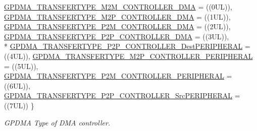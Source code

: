 \begin{DoxyCompactItemize}
\hyperlink{group__GPDMA__17XX__40XX_gga2cb59b641cd840f22780c44be1208133ae5ff87adb4451f2a695c9d21c3c52c59}{G\-P\-D\-M\-A\-\_\-\-T\-R\-A\-N\-S\-F\-E\-R\-T\-Y\-P\-E\-\_\-\-M2\-M\-\_\-\-C\-O\-N\-T\-R\-O\-L\-L\-E\-R\-\_\-\-D\-M\-A} = ((0\-U\-L)), 
\hyperlink{group__GPDMA__17XX__40XX_gga2cb59b641cd840f22780c44be1208133a331474560497f41cfe921b0e55ce8722}{G\-P\-D\-M\-A\-\_\-\-T\-R\-A\-N\-S\-F\-E\-R\-T\-Y\-P\-E\-\_\-\-M2\-P\-\_\-\-C\-O\-N\-T\-R\-O\-L\-L\-E\-R\-\_\-\-D\-M\-A} = ((1\-U\-L)), 
\hyperlink{group__GPDMA__17XX__40XX_gga2cb59b641cd840f22780c44be1208133aa2ae587fb924cb679f51250470927e34}{G\-P\-D\-M\-A\-\_\-\-T\-R\-A\-N\-S\-F\-E\-R\-T\-Y\-P\-E\-\_\-\-P2\-M\-\_\-\-C\-O\-N\-T\-R\-O\-L\-L\-E\-R\-\_\-\-D\-M\-A} = ((2\-U\-L)), 
\hyperlink{group__GPDMA__17XX__40XX_gga2cb59b641cd840f22780c44be1208133a29ec59e967f3a1841002ef740552c1d5}{G\-P\-D\-M\-A\-\_\-\-T\-R\-A\-N\-S\-F\-E\-R\-T\-Y\-P\-E\-\_\-\-P2\-P\-\_\-\-C\-O\-N\-T\-R\-O\-L\-L\-E\-R\-\_\-\-D\-M\-A} = ((3\-U\-L)), 
\\*
\hyperlink{group__GPDMA__17XX__40XX_gga2cb59b641cd840f22780c44be1208133a176e307292918213de220bdae957ad6d}{G\-P\-D\-M\-A\-\_\-\-T\-R\-A\-N\-S\-F\-E\-R\-T\-Y\-P\-E\-\_\-\-P2\-P\-\_\-\-C\-O\-N\-T\-R\-O\-L\-L\-E\-R\-\_\-\-Dest\-P\-E\-R\-I\-P\-H\-E\-R\-A\-L} = ((4\-U\-L)), 
\hyperlink{group__GPDMA__17XX__40XX_gga2cb59b641cd840f22780c44be1208133a640177df7a3c696a9ccab9a09dcdbc0c}{G\-P\-D\-M\-A\-\_\-\-T\-R\-A\-N\-S\-F\-E\-R\-T\-Y\-P\-E\-\_\-\-M2\-P\-\_\-\-C\-O\-N\-T\-R\-O\-L\-L\-E\-R\-\_\-\-P\-E\-R\-I\-P\-H\-E\-R\-A\-L} = ((5\-U\-L)), 
\hyperlink{group__GPDMA__17XX__40XX_gga2cb59b641cd840f22780c44be1208133aaeaf72b20cee326722ee7650405e2e43}{G\-P\-D\-M\-A\-\_\-\-T\-R\-A\-N\-S\-F\-E\-R\-T\-Y\-P\-E\-\_\-\-P2\-M\-\_\-\-C\-O\-N\-T\-R\-O\-L\-L\-E\-R\-\_\-\-P\-E\-R\-I\-P\-H\-E\-R\-A\-L} = ((6\-U\-L)), 
\hyperlink{group__GPDMA__17XX__40XX_gga2cb59b641cd840f22780c44be1208133a4615bdb6a415ddc02f8eab20a700a17d}{G\-P\-D\-M\-A\-\_\-\-T\-R\-A\-N\-S\-F\-E\-R\-T\-Y\-P\-E\-\_\-\-P2\-P\-\_\-\-C\-O\-N\-T\-R\-O\-L\-L\-E\-R\-\_\-\-Src\-P\-E\-R\-I\-P\-H\-E\-R\-A\-L} = ((7\-U\-L))
 \}
\begin{DoxyCompactList}\small\item\em G\-P\-D\-M\-A Type of D\-M\-A controller. \end{DoxyCompactList}\end{DoxyCompactItemize}
